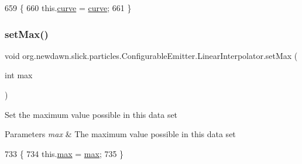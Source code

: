 \begin{DoxyCode}
659                                               \{
660             this.\mbox{\hyperlink{classorg_1_1newdawn_1_1slick_1_1particles_1_1_configurable_emitter_1_1_linear_interpolator_a2029dd987ff4a634d2bc06e5828852c4}{curve}} = \mbox{\hyperlink{classorg_1_1newdawn_1_1slick_1_1particles_1_1_configurable_emitter_1_1_linear_interpolator_a2029dd987ff4a634d2bc06e5828852c4}{curve}};
661         \}
\end{DoxyCode}
\mbox{\label{classorg_1_1newdawn_1_1slick_1_1particles_1_1_configurable_emitter_1_1_linear_interpolator_ae6c2d4d3b1014034581b67056e7863d3}} 
\subsubsection{\texorpdfstring{set\+Max()}{setMax()}}
{\footnotesize\ttfamily void org.\+newdawn.\+slick.\+particles.\+Configurable\+Emitter.\+Linear\+Interpolator.\+set\+Max (\begin{DoxyParamCaption}\item[{int}]{max }\end{DoxyParamCaption})\hspace{0.3cm}{\ttfamily [inline]}}

Set the maximum value possible in this data set


\begin{DoxyParams}{Parameters}
{\em max} & The maximum value possible in this data set \\
\hline
\end{DoxyParams}

\begin{DoxyCode}
733                                     \{
734             this.\mbox{\hyperlink{classorg_1_1newdawn_1_1slick_1_1particles_1_1_configurable_emitter_1_1_linear_interpolator_adc1986c1f968ccd9155e19fac44c66da}{max}} = \mbox{\hyperlink{classorg_1_1newdawn_1_1slick_1_1particles_1_1_configurable_emitter_1_1_linear_interpolator_adc1986c1f968ccd9155e19fac44c66da}{max}};
735         \}
\end{DoxyCode}
\mbox{\label{classorg_1_1newdawn_1_1slick_1_1particles_1_1_configurable_emitter_1_1_linear_interpolator_ab8f7a467949157b5f7e8185416a9d60b}} 
